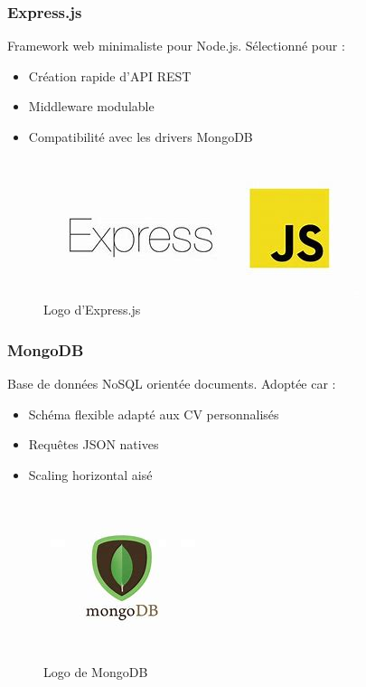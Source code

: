 \documentclass[12pt]{report}
\begin{document}
\subsubsection{Express.js}
Framework web minimaliste pour Node.js. Sélectionné pour :
\begin{itemize}
    \item Création rapide d'API REST
    \item Middleware modulable
    \item Compatibilité avec les drivers MongoDB
\end{itemize}

\begin{figure}[H]
    \centering
    \includegraphics[width=0.8\linewidth]{./imgs/expressLogo.jpg}
    \caption{Logo d’Express.js}
    \label{fig:express}
\end{figure}

\subsubsection{MongoDB}
Base de données NoSQL orientée documents. Adoptée car :
\begin{itemize}
    \item Schéma flexible adapté aux CV personnalisés
    \item Requêtes JSON natives
    \item Scaling horizontal aisé
\end{itemize}

\begin{figure}[H]
    \centering
    \includegraphics[width=0.6\linewidth]{./imgs/mongodbLogo.jpg}
    \caption{Logo de MongoDB}
    \label{fig:mongodb}
\end{figure}
\end{document}
